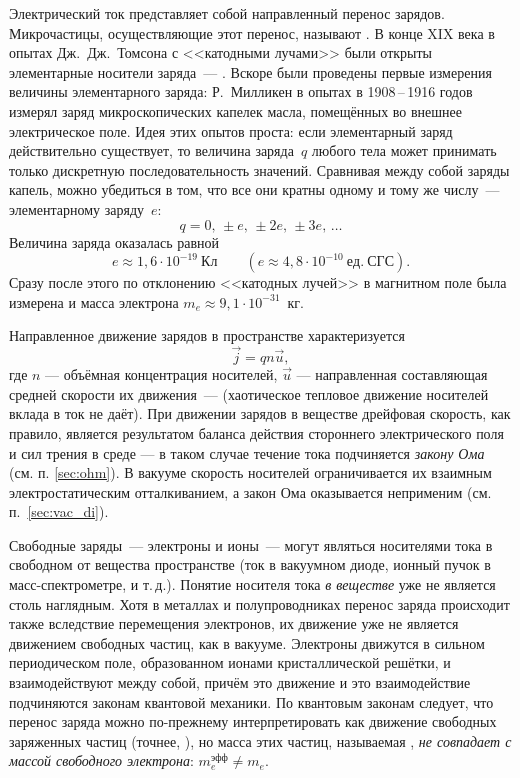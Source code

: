 Электрический ток представляет собой направленный перенос зарядов. Микрочастицы,
осуществляющие этот перенос, называют . В конце
XIX века в опытах Дж.~Дж.~Томсона с <<катодными лучами>> были открыты
элементарные носители заряда~--- . Вскоре были проведены
первые измерения величины элементарного заряда: Р.~Милликен
в опытах в 1908\,--\,1916 годов измерял заряд микроскопических капелек масла,
помещённых во внешнее электрическое поле. Идея этих опытов проста:
если элементарный заряд действительно существует, то величина заряда~$q$
любого тела может принимать только дискретную последовательность значений.
Сравнивая между собой заряды капель, можно убедиться в том, что все они
кратны одному и тому же числу~--- элементарному заряду~$e$:
\begin{equation*}
    q = 0,\,\pm e,\,\pm2e,\,\pm3e,\, \ldots
\end{equation*}
Величина заряда оказалась равной
\[
e\approx1,6\cdot 10^{-19}~Кл\qquad (e\approx 4,8\cdot 10^{-10}~ед.~СГС).
\]
Сразу после этого по отклонению <<катодных лучей>> в магнитном поле была
измерена и масса электрона $m_e\approx 9,1\cdot 10^{-31}$~кг.

Направленное движение зарядов в пространстве характеризуется 
\begin{equation}
\vec{j} = q n \vec{u},
\end{equation}
где $n$ --- объёмная концентрация носителей, $\vec{u}$ --- направленная составляющая 
средней скорости их движения~---  (хаотическое тепловое
движение носителей вклада в ток не даёт). При движении зарядов в веществе
дрейфовая скорость, как правило, является результатом баланса действия 
стороннего электрического поля и сил трения в среде --- в таком
случае течение тока подчиняется \emph{закону Ома} (см. п. \ref{sec:ohm}).
В вакууме скорость носителей ограничивается их взаимным электростатическим
отталкиванием, а закон Ома оказывается неприменим (см. п.~\ref{sec:vac_di}).

Свободные заряды~--- электроны и ионы~--- могут являться носителями тока 
в свободном от вещества пространстве (ток в вакуумном диоде, ионный пучок в масс-спектрометре, и
т.\,д.). Понятие носителя тока \emph{в веществе} уже не является столь
наглядным. Хотя в металлах и полупроводниках перенос заряда происходит
также вследствие перемещения электронов, их движение уже не является
движением свободных частиц, как в вакууме. Электроны движутся в сильном
периодическом поле, образованном ионами кристаллической решётки, и
взаимодействуют между собой, причём это движение и это взаимодействие
подчиняются законам квантовой механики. По квантовым законам следует, что перенос
заряда можно по-прежнему интерпретировать как движение свободных заряженных
частиц (точнее, ), но масса этих частиц, называемая
, \emph{не совпадает с массой свободного
электрона}: $m_{e}^{эфф}\ne m_e$.

